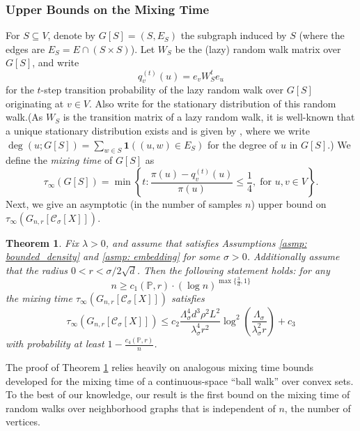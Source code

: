 \documentclass{article}
\newcommand{\set}[1]{\left\{#1\right\}}
\newcommand{\vol}{\mathrm{vol}}
\newcommand{\1}{\mathbf{1}}
\newcommand{\Cset}{\mathcal{C}}
\newcommand{\Csig}{\Cset_{\sigma}}
\newcommand{\Pbb}{\mathbb{P}}
\newcommand{\Cbb}{\mathbb{C}}
\theoremstyle{alden}
\theoremstyle{aldenthm}
\newtheorem{theorem}{Theorem}
\theoremstyle{definition}
\theoremstyle{remark}
\begin{document}
\subsubsection{Upper Bounds on the Mixing Time} 
For $S \subseteq V$, denote by $G[S] = (S, E_S)$ the
subgraph induced by $S$ (where the edges are $E_S = E \cap (S \times S)$). Let
$W_S$ be the (lazy) random walk matrix over $G[S]$, and write  
$$
q_{v}^{(t)}(u) = e_vW_S^t e_u
$$
for the $t$-step transition probability of the lazy random walk over $G[S]$
originating at $v \in V$. Also write 
for the stationary distribution of this random walk.(As
$W_S$ is the transition matrix of a lazy random walk, 
it is well-known that a unique stationary distribution exists and is given by 
\smash{$\pi(u) = \deg(u;G[S])/\vol(S; G[S])$}, where we write $\deg(u;G[S]) = \sum_{w \in S} \1((u,w) \in E_S)$ for the degree of $u$ in $G[S]$.) We define the \emph{mixing time} of $G[S]$ as
\begin{equation}
\label{eqn: mixing_time}
\tau_{\infty}(G[S]) = \min\set{ t: \frac{\pi(u) - q_{v}^{(t)}(u)}
	{\pi(u)} \leq \frac{1}{4}, \; \text{for $u,v \in V$}}. 
\end{equation}
Next, we give an asymptotic (in the number of samples $n$) upper bound on
$\tau_{\infty}(G_{n,r}[\Csig[X]])$.  

\begin{theorem}
	\label{thm: mixing_time_upper_bound}
	Fix $\lambda > 0$, and assume that \smash{$\Cset \in \Cbb_f(\lambda)$}
	satisfies Assumptions \ref{asmp: bounded_density} and \ref{asmp: embedding}
	for some $\sigma > 0$. Additionally assume that the radius $0 < r < \sigma/2\sqrt{d}$. Then the following statement holds: for any
	\begin{equation*}
	n \geq c_1(\Pbb,r)\cdot(\log n)^{\max\{\frac{3}{d},1\}}
	\end{equation*}
	the mixing time $\tau_{\infty}(G_{n,r}[\Csig[X]])$ satisfies
	\begin{equation} 
	\label{eqn: mixing_time_upper_bound}
	\tau_{\infty}(G_{n,r}[\Csig[X]]) \leq c_2 \frac{\Lambda_{\sigma}^4 d^3 \rho^2 L^2}{\lambda_{\sigma}^4 r^2} \log^2\left(\frac{ \Lambda_{\sigma}}{\lambda_{\sigma}^2 r}\right) + c_3
	\end{equation}
	with probability at least $1 - \frac{c_4(\Pbb,r)}{n}$.
\end{theorem}
The proof of Theorem \ref{thm: mixing_time_upper_bound} relies heavily on
analogous mixing time bounds developed for the mixing time of a
continuous-space ``ball walk'' over convex sets. To the best of our knowledge, our
result is the first bound on the mixing time of random walks
over neighborhood graphs that is independent of $n$, the number of vertices.   
\end{document}
